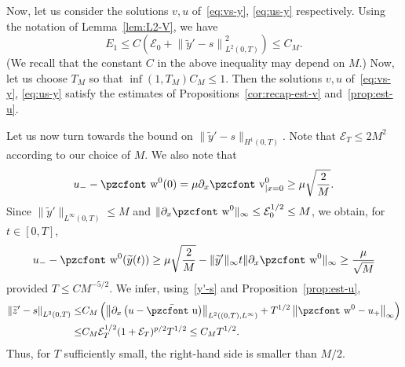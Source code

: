 \documentclass[10pt]{amsart}
\theoremstyle{definition}\newtheorem{defi}[theo]{Definition}\newtheorem{rema}[theo]{Remark}\newtheorem{exam}[theo]{Example}\newtheorem{exem}[theo]{Example}\newtheorem{nota}[theo]{Notation}
\newcommand{\mathpzc}[1]{\text{\pzcfont #1}}
\newcommand{\p}{\partial}
\newcommand{\bu}{\bar{\mathpzc{u}}}
\newcommand{\cE}{\mathcal E}
\newcommand{\tv}{\mathpzc{v}}
\newcommand{\tw}{\mathpzc{w}}
\newcommand{\ty}{\widetilde{y}}
\newcommand{\tz}{\widetilde{z}}
\begin{document}
Now, let us consider the solutions $v,u$ of~\eqref{eq:vs-y}, \eqref{eq:us-y} respectively. Using the notation of Lemma~\ref{lem:L2-V}, we have
\[
E_1\leq C\left(\cE_0 + \left\|\ty'-s\right\|_{L^2(0,T)}^2\right)\leq C_M.
\]
(We recall that the constant $C$ in the above inequality may depend on $M$.) Now, let us choose $T_M$ so that $\inf(1,T_M) C_M\leq 1$. Then the solutions $v,u$ of~\eqref{eq:vs-y}, \eqref{eq:us-y} satisfy the estimates of Propositions~\ref{cor:recap-est-v} and~\ref{prop:est-u}.



Let us now turn towards the bound on $\|\ty'-s\|_{H^1(0,T)}$. Note that $\cE_T\leq 2M^2$ according to our choice of $M$. We also note that
\[
u_--\tw^0(0) = \mu \p_x \tv^0_{|x=0}
\geq \mu\sqrt{\frac{2}{M}}.
\]
Since $\|\ty'\|_{L^\infty(0,T)}\leq M$ and $\|\p_x \tw^0\|_\infty \leq \cE_0^{1/2} \leq M$, we obtain, for $t\in [0,T]$,
\begin{equation}\label{est-lower-bound-u_-w0}
u_--\tw^0(\ty(t))
\geq \mu \sqrt{\frac{2}{M}} - \|\ty'\|_\infty t \|\p_x\tw^0\|_\infty
\geq \frac{\mu}{\sqrt{M}}
\end{equation} provided $T\leq C M^{-5/2}$. We infer, using~\eqref{y'-s} and Proposition~\ref{prop:est-u},
\begin{align*}
\left\|\tz'-s\right\|_{L^2(0,T)}\leq &C_M \left(\left\|\p_x \left(u-\bu\right)\right\|_{L^2\left((0,T), L^\infty\right)} + T^{1/2} \left\|\tw^0- u_+\right\|_\infty\right)\\
\leq& C_M \cE_T^{1/2} (1 + \cE_T)^{p/2}T^{1/2}\leq C_M T^{1/2}.
\end{align*}
Thus, for $T$ sufficiently small, the right-hand side is smaller than $M/2$.
\end{document}
